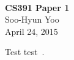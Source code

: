 \documentclass[12pt,letterpaper]{article}
\begin{document}
\fancyfoot{}
\begin{center}
    \hfill \\
    \vspace{4in}
    {\bf\Huge CS391 Paper 1 \\}
    \vspace{2in}
    {\Large Soo-Hyun Yoo \\ April 24, 2015}
\end{center}

\newpage
{}

Test test~\cite{moraetal2013}.










\end{document}

